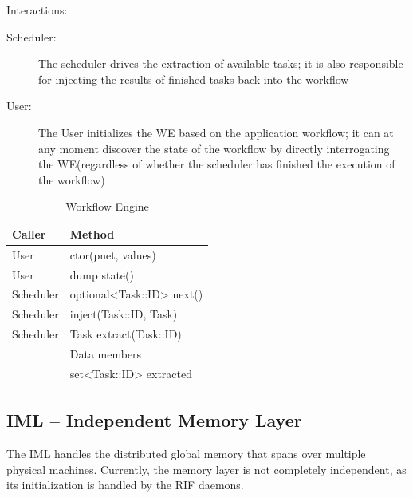 \documentclass[10pt]{article}
\newcommand{\user}{User\xspace}
\newcommand{\sched}{Scheduler\xspace}
\newcommand{\iml}{IML\xspace}
\newcommand{\we}{WE\xspace}
\newcommand{\rif}{RIF\xspace}
\newcommand{\task}{Task\xspace}
\newcommand{\id}{::ID\xspace}
\begin{document}
Interactions:
\begin{description}
    \item [\sched:] The scheduler drives the extraction of available tasks; it
    is also responsible for injecting the results of finished tasks back into the
    workflow
    \item [\user:] The \user initializes the \we based on the application
    workflow; it can at any moment discover the state of the workflow by directly
    interrogating the \we (regardless of whether the scheduler has finished the
    execution of the workflow)
\end{description}
%
\begin{table}[ht]
    \centering
    \caption{Workflow Engine}
    \label{tab:we}
    \bgroup
    \setlength{\tabcolsep}{2em}
    \begin{tabular}{ll}
        \toprule
        Caller & Method \\
        \midrule
        \user & ctor(pnet, values) \\
        \user & dump state() \\
        \sched & optional<\task\id> next()  \\
        \sched & inject(\task\id, \task) \\
        \sched & \task extract(\task\id) \\
        \midrule
        & Data members \\
        \midrule
        & set<\task\id> extracted \\
        \bottomrule
    \end{tabular}
    \egroup
\end{table}
%

\subsection{IML -- Independent Memory Layer}
The \iml handles the distributed global memory that spans over multiple 
physical machines.
Currently, the memory layer is not completely independent, as its 
initialization is handled by the \rif daemons. 
\end{document}
